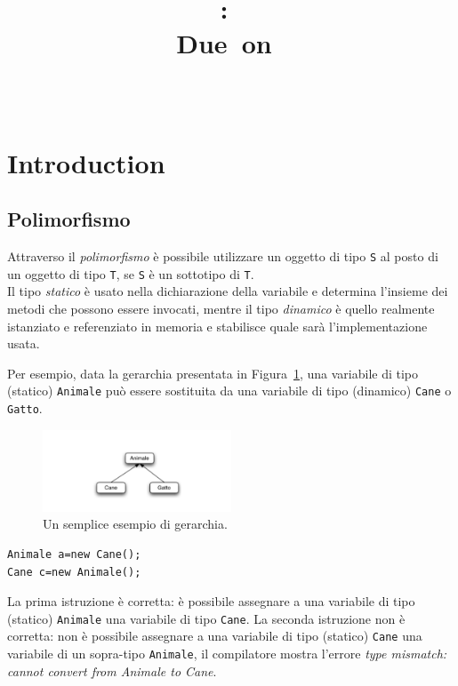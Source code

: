 \documentclass{article}
\title{
\vspace{2in}
\textmd{\textbf{\hmwkClass:\ \hmwkTitle}}\\
\normalsize\vspace{0.1in}\small{Due\ on\ \hmwkDueDate}\\
\vspace{0.1in}\large{\textit{\hmwkClassInstructor\ \hmwkClassTime}}
\vspace{3in}
}
\author{\textbf{\hmwkAuthorName}}
\date{} %
\begin{document}
\maketitle



\newpage
\tableofcontents
\newpage



\section{Introduction}


\subsection{Polimorfismo}
Attraverso il \emph{polimorfismo} \`e possibile utilizzare un oggetto di tipo \texttt{S} al posto di un oggetto di tipo \texttt{T}, se \texttt{S} \`e un sottotipo di \texttt{T}.\\
Il tipo  \emph{statico} \`e usato nella dichiarazione della variabile e determina l'insieme dei metodi che possono essere invocati, mentre il tipo \emph{dinamico} \`e  quello realmente istanziato e referenziato in memoria e stabilisce quale sar\`a l'implementazione usata.

Per esempio, data la gerarchia presentata in Figura~\ref{Fig:gerarchy1}, una variabile di tipo (statico) \texttt{Animale} pu\`o essere sostituita da una variabile di tipo (dinamico) \texttt{Cane} o \texttt{Gatto}.

\begin{figure}[h!]
  \centering
    \includegraphics[width=0.5\textwidth]{gerarchia.pdf}
      \caption{Un semplice esempio di gerarchia.}
      \label{Fig:gerarchy1}
\end{figure}
\begin{lstlisting}
Animale a=new Cane();
Cane c=new Animale();
\end{lstlisting}
La prima istruzione \`e corretta: \`e possibile assegnare a una variabile di tipo (statico) \texttt{Animale} una variabile di tipo \texttt{Cane}.
La seconda istruzione non \`e corretta: non \`e possibile assegnare a una variabile di tipo (statico) \texttt{Cane} una variabile di un sopra-tipo \texttt{Animale}, il compilatore mostra l'errore \emph{type mismatch: cannot convert from Animale to Cane}.
\end{document}
